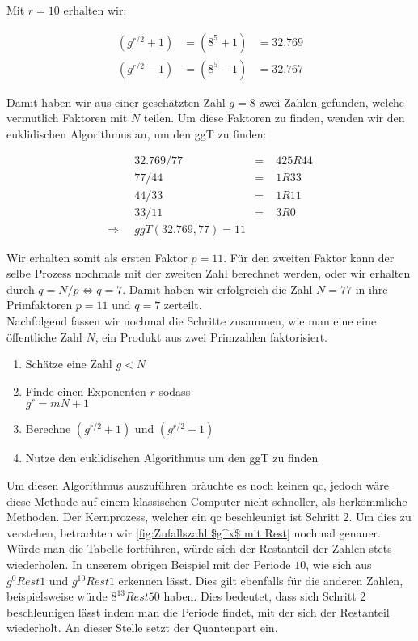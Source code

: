 Mit $r = 10$ erhalten wir:

\begin{align*}
    (g^{r/2} + 1) &= (8^5 + 1) &= 32.769 \\
    (g^{r/2} - 1) &= (8^5 - 1) &= 32.767
\end{align*}

Damit haben wir aus einer geschätzten Zahl $g = 8$ zwei Zahlen gefunden, welche vermutlich Faktoren mit $N$ teilen. 
Um diese Faktoren zu finden, wenden wir den euklidischen Algorithmus an, um den \ac*{ggT} zu finden:

\begin{align*}
    & 32.769 / 77 &=\;&  425 R 44    \\
    & 77 / 44     &=\;&  1 R 33      \\
    & 44 / 33     &=\;&  1 R 11      \\
    & 33 / 11     &=\;&  3 R 0       \\
    \Rightarrow\;\; & ggT(32.769, 77) = 11
\end{align*}

Wir erhalten somit als ersten Faktor $p = 11$. 
Für den zweiten Faktor kann der selbe Prozess nochmals mit der zweiten Zahl berechnet werden, oder wir erhalten durch $q = N/p \Leftrightarrow q = 7$. 
Damit haben wir erfolgreich die Zahl $N = 77$ in ihre Primfaktoren $p=11$ und $q=7$ zerteilt.\\


Nachfolgend fassen wir nochmal die Schritte zusammen, wie man eine eine öffentliche Zahl $N$, ein Produkt aus zwei Primzahlen faktorisiert.

\begin{enumerate}
    \item Schätze eine Zahl $g < N$
    \item Finde einen Exponenten $r$ sodass\\$g^r = mN + 1$
    \item Berechne $(g^{r/2} + 1)$ und $(g^{r/2} - 1)$
    \item Nutze den euklidischen Algorithmus um den \ac{ggT} zu finden\\
\end{enumerate}

Um diesen Algorithmus auszuführen bräuchte es noch keinen \ac{qc}, jedoch wäre diese Methode auf einem klassischen Computer nicht schneller, als herkömmliche Methoden. 
Der Kernprozess, welcher ein \ac{qc} beschleunigt ist Schritt 2. Um dies zu verstehen, betrachten wir \ref{fig:Zufallszahl $g^x$ mit Rest} nochmal genauer. 
Würde man die Tabelle fortführen, würde sich der Restanteil der Zahlen stets wiederholen. In unserem obrigen Beispiel mit der Periode $10$, 
wie sich aus $g^0 Rest 1$ und $g^{10} Rest 1$ erkennen lässt. Dies gilt ebenfalls für die anderen Zahlen, beispielsweise würde $8^{13} Rest 50$ haben.
Dies bedeutet, dass sich Schritt 2 beschleunigen lässt indem man die Periode findet, mit der sich der Restanteil wiederholt. 
An dieser Stelle setzt der Quantenpart ein.\\

